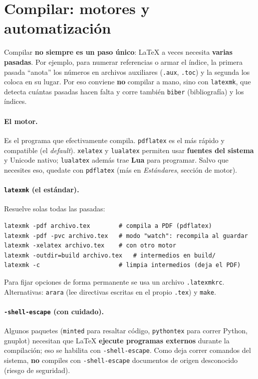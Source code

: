 \documentclass[11pt,a4paper]{article}
\begin{document}
\section{Compilar: motores y automatización}
Compilar \textbf{no siempre es un paso único}: \LaTeX{} a veces necesita
\textbf{varias pasadas}. Por ejemplo, para numerar referencias o armar el índice,
la primera pasada \enquote{anota} los números en archivos auxiliares
(\texttt{.aux}, \texttt{.toc}) y la segunda los coloca en su lugar. Por eso
conviene \textbf{no} compilar a mano, sino con \texttt{latexmk}, que detecta
cuántas pasadas hacen falta y corre también \texttt{biber} (bibliografía) y los
índices.

\paragraph{El motor.} Es el programa que efectivamente compila. \texttt{pdflatex}
es el más rápido y compatible (el \emph{default}). \texttt{xelatex} y
\texttt{lualatex} permiten usar \textbf{fuentes del sistema} y Unicode nativo;
\texttt{lualatex} además trae \textbf{Lua} para programar. Salvo que necesites
eso, quedate con \texttt{pdflatex} (más en \emph{Estándares}, sección de motor).

\paragraph{\texttt{latexmk} (el estándar).} Resuelve solas todas las pasadas:
\begin{lstlisting}
latexmk -pdf archivo.tex        # compila a PDF (pdflatex)
latexmk -pdf -pvc archivo.tex   # modo "watch": recompila al guardar
latexmk -xelatex archivo.tex    # con otro motor
latexmk -outdir=build archivo.tex   # intermedios en build/
latexmk -c                      # limpia intermedios (deja el PDF)
\end{lstlisting}
Para fijar opciones de forma permanente se usa un archivo \texttt{.latexmkrc}.
Alternativas: \texttt{arara} (lee directivas escritas en el propio \texttt{.tex})
y \texttt{make}.

\paragraph{\texttt{-shell-escape} (con cuidado).} Algunos paquetes
(\texttt{minted} para resaltar código, \texttt{pythontex} para correr Python,
gnuplot) necesitan que \LaTeX{} \textbf{ejecute programas externos} durante la
compilación; eso se habilita con \texttt{-shell-escape}. Como deja correr
comandos del sistema, \textbf{no} compiles con \texttt{-shell-escape} documentos
de origen desconocido (riesgo de seguridad).
\end{document}
